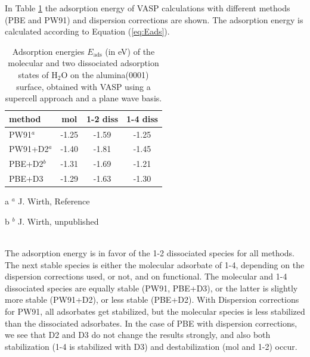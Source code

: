 \documentclass[11pt,DIV=13,BCOR=5mm,a4paper,headinclude]{scrbook}
\begin{document}
In Table \ref{tab:vasp-results} the adsorption energy of VASP calculations with different methods (PBE and PW91) and dispersion corrections are shown.
The adsorption energy is calculated according to Equation (\ref{eq:Eads}).
\begin{table}[!h]
  \centering
   \caption{Adsorption energies $E_\textrm{ads}$ (in eV) of the molecular and two dissociated adsorption states of H$_2$O on the alumina(0001) surface, obtained with VASP using a supercell approach and a plane wave basis.}
  \begin{tabular}{l|ccc}%
  \toprule
  method & mol & 1-2 diss & 1-4 diss\\\midrule %
  PW91$^a$   &-1.25 &-1.59 &-1.25 \\%
  PW91+D2$^a$&-1.40 &-1.81 &-1.45 \\%
  PBE+D2$^b$ & -1.31 & -1.69 & -1.21 \\
  PBE+D3 &-1.29&-1.63 &-1.30 \\\bottomrule%
  \end{tabular}
    \begin{tablenotes}
 \footnotesize
\item[a] $^a$ J. Wirth, Reference \cite{WirthJPCC2012,Wirth2014thesis}
\item[b] $^b$ J. Wirth, unpublished
\end{tablenotes}
  \label{tab:vasp-results}
 \end{table}
\\

The adsorption energy is in favor of the 1-2 dissociated species for all methods.
The next stable species is either the molecular adsorbate of 1-4, depending on the dispersion corrections used, or not, and on functional.
The molecular and 1-4 dissociated species are equally stable (PW91, PBE+D3), or the latter is slightly more stable (PW91+D2), or less stable (PBE+D2).
With Dispersion corrections for PW91, all adsorbates get stabilized, but the molecular species is less stabilized than the dissociated adsorbates.
In the case of PBE with dispersion corrections, we see that D2 and D3 do not change the results strongly, and also both stabilization (1-4 is stabilized with D3) and destabilization (mol and 1-2) occur.
\end{document}

